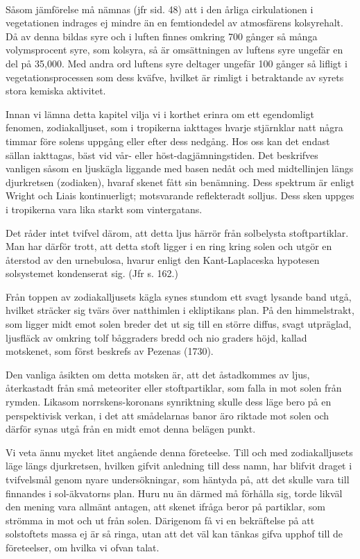 \documentclass[a4paper, 12pt, oneside, swedish]{article}
\begin{document}
\paragraph{}
Såsom jämförelse må nämnas (jfr sid. 48) att i den årliga cirkulationen i vegetationen indrages ej mindre än en femtiondedel av atmosfärens kolsyrehalt. Då av denna bildas syre och i luften finnes omkring 700 gånger så många volymsprocent syre, som kolsyra, så är omsättningen av luftens syre ungefär en del på 35,000. Med andra ord luftens syre deltager ungefär 100 gånger så lifligt i vegetationsprocessen som dess kväfve, hvilket är rimligt i betraktande av syrets stora kemiska aktivitet.

Innan vi lämna detta kapitel vilja vi i korthet erinra om ett egendomligt fenomen, zodiakalljuset, som i tropikerna iakttages hvarje stjärnklar natt några timmar före solens uppgång eller efter dess nedgång. Hos oss kan det endast sällan iakttagas, bäst vid vår- eller höst-dagjämningstiden. Det beskrifves vanligen såsom en ljuskägla liggande med basen nedåt och med midtellinjen längs djurkretsen (zodiaken), hvaraf skenet fått sin benämning. Dess spektrum är enligt Wright och Liais kontinuerligt; motsvarande reflekteradt solljus. Dess sken uppges i tropikerna vara lika starkt som vintergatans.

Det råder intet tvifvel därom, att detta ljus härrör från solbelysta stoftpartiklar. Man har därför trott, att detta stoft ligger i en ring kring solen och utgör en återstod av den urnebulosa, hvarur enligt den Kant-Laplaceska hypotesen solsystemet kondenserat sig. (Jfr s. 162.)

Från toppen av zodiakalljusets kägla synes stundom ett svagt lysande band utgå, hvilket sträcker sig tvärs över natthimlen i ekliptikans plan. På den himmelstrakt, som ligger midt emot solen breder det ut sig till en större diffus, svagt utpräglad, ljusfläck av omkring tolf båggraders bredd och nio graders höjd, kallad motskenet, som först beskrefs av Pezenas (1730).

Den vanliga åsikten om detta motsken är, att det åstadkommes av ljus, återkastadt från små meteoriter eller stoftpartiklar, som falla in mot solen från rymden. Likasom norrskens-koronans synriktning skulle dess läge bero på en perspektivisk verkan, i det att smådelarnas banor äro riktade mot solen och därför synas utgå från en midt emot denna belägen punkt.

Vi veta ännu mycket litet angående denna företeelse. Till och med zodiakalljusets läge längs djurkretsen, hvilken gifvit anledning till dess namn, har blifvit draget i tvifvelsmål genom nyare undersökningar, som häntyda på, att det skulle vara till finnandes i sol-äkvatorns plan. Huru nu än därmed må förhålla sig, torde likväl den mening vara allmänt antagen, att skenet ifråga beror på partiklar, som strömma in mot och ut från solen. Därigenom få vi en bekräftelse på att solstoftets massa ej är så ringa, utan att det väl kan tänkas gifva upphof till de företeelser, om hvilka vi ofvan talat.
\clearpage
\end{document}
